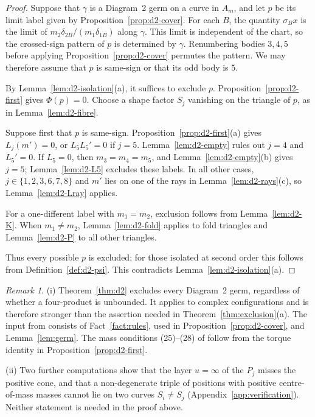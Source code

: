 \documentclass[11pt]{amsart}
\theoremstyle{definition}
\theoremstyle{remark}
\newtheorem{remark}[theorem]{Remark}
\begin{document}
\begin{proof}
{Suppose that $\gamma$ is a Diagram~2 germ on a curve in $A_m$, and
let $p$ be its limit label given by Proposition~\ref{prop:d2-cover}.
For each $B$, the quantity $\sigma_Bx$ is the limit of
$m_2\delta_{2B}/(m_1\delta_{1B})$ along $\gamma$.
This limit is independent of the chart, so the crossed-sign pattern of $p$ is
determined by $\gamma$.
Renumbering bodies $3,4,5$ before applying Proposition~\ref{prop:d2-cover} permutes the
pattern.  We may therefore assume that $p$ is same-sign or that its odd body is $5$.

By Lemma~\ref{lem:d2-isolation}(a), it suffices to exclude $p$.
Proposition~\ref{prop:d2-first} gives $\Phi(p)=0$.
Choose a shape factor $S_j$ vanishing on the triangle of $p$, as in
Lemma~\ref{lem:d2-fibre}.}

{Suppose first that $p$ is same-sign.
Proposition~\ref{prop:d2-first}(a) gives $L_j(m')=0$, or $L_5L_5'=0$ if $j=5$.
Lemma~\ref{lem:d2-empty} rules out $j=4$ and $L_5'=0$.
If $L_5=0$, then $m_3=m_4=m_5$, and Lemma~\ref{lem:d2-empty}(b) gives $j=5$;
Lemma~\ref{lem:d2-L5} excludes these labels.
In all other cases, $j\in\{1,2,3,6,7,8\}$ and $m'$ lies on one of the rays in
Lemma~\ref{lem:d2-rays}(c), so Lemma~\ref{lem:d2-Lray} applies.}

{For a one-different label with $m_1=m_2$, exclusion follows from
Lemma~\ref{lem:d2-K}.
When $m_1\ne m_2$, Lemma~\ref{lem:d2-fold} applies to fold triangles and
Lemma~\ref{lem:d2-P} to all other triangles.}

{Thus every possible $p$ is excluded; for those isolated at second
order this follows from Definition~\ref{def:d2-psi}.
This contradicts Lemma~\ref{lem:d2-isolation}(a).}
\end{proof}

\begin{remark}\label{rem:d2-scope}
{(i) Theorem~\ref{thm:d2} excludes every Diagram~2 germ, regardless
of whether a four-product is unbounded.  It applies to complex configurations and is
therefore stronger than the assertion needed in Theorem~\ref{thm:exclusion}(a).
The input from \cite{AK} consists of Fact~\ref{fact:rules}, used in
Proposition~\ref{prop:d2-cover}, and Lemma~\ref{lem:germ}.
The mass conditions (25)--(28) of \cite[\S8.2]{AK} follow from the torque identity in
Proposition~\ref{prop:d2-first}.}

{(ii) Two further computations show that the layer $u=\infty$ of
the $P_j$ misses the positive cone, and that a non-degenerate triple of positions with
positive centre-of-mass masses cannot lie on two curves $S_i\ne S_j$
(Appendix~\ref{app:verification}).
Neither statement is needed in the proof above.}
\end{remark}
\end{document}
